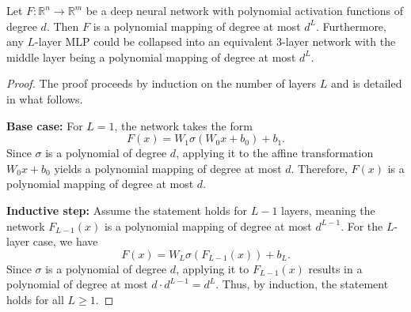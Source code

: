\documentclass[10pt,a4paper]{amsart}
\begin{document}
\begin{proposition}
\label{prop:mapping}
    Let $F: \mathbb{R}^n \to \mathbb{R}^m$ be a deep neural network with polynomial activation functions of degree $d$. Then $F$ is a polynomial mapping of degree at most $d^L$. Furthermore, any $L$-layer MLP could be collapsed into an equivalent 3-layer network with the middle layer being a polynomial mapping of degree at most $d^L$.
\end{proposition}

\begin{proof}
    The proof proceeds by induction on the number of layers $L$ and is detailed in what follows.
    
    \textbf{Base case:} For $L = 1$, the network takes the form
    \[
        F(x) = W_1 \sigma(W_0 x + b_0) + b_1.
    \]
    Since $\sigma$ is a polynomial of degree $d$, applying it to the affine transformation $W_0 x + b_0$ yields a polynomial mapping of degree at most $d$. Therefore, $F(x)$ is a polynomial mapping of degree at most $d$.

    \textbf{Inductive step:} Assume the statement holds for $L-1$ layers, meaning the network $F_{L-1}(x)$ is a polynomial mapping of degree at most $d^{L-1}$. For the $L$-layer case, we have
    \[
        F(x) = W_L \sigma(F_{L-1}(x)) + b_L.
    \]
    Since $\sigma$ is a polynomial of degree $d$, applying it to $F_{L-1}(x)$ results in a polynomial of degree at most $d \cdot d^{L-1} = d^L$. Thus, by induction, the statement holds for all $L \geq 1$.
\end{proof}
\end{document}
